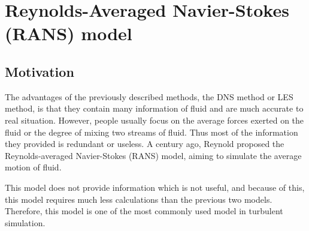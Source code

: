 \documentclass[english, nochinese]{pkupaper}
\begin{document}
\section{Reynolds-Averaged Navier-Stokes (RANS) model}

\subsection{Motivation}
\par The advantages of the previously described methods, the DNS method or LES method, is that they contain many information of fluid and are much accurate to real situation. However, people usually focus on the average forces exerted on the fluid or the degree of mixing two streams of fluid. Thus most of the information they provided is redundant or useless. A century ago, Reynold proposed the Reynolds-averaged Navier-Stokes (RANS) model, aiming to simulate the average motion of fluid. 
\par This model does not provide information which is not useful, and because of this, this model requires much less calculations than the previous two models. Therefore, this model is one of the most commonly used model in turbulent simulation.
\end{document}
